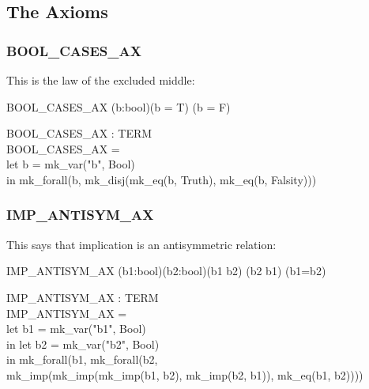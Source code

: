 \documentclass[a4paper,11pt,titlepage]{article}
\begin{document}
\begin{titlepage}
\subsection{The Axioms}
\subsubsection{BOOL\_CASES\_AX}
This is the law of the excluded middle:
\begin{GFT}{}
\+BOOL\_CASES\Backslash{}\_AX \MMM{\Zthm} \MMM{\forall}(b:bool)\MMM{\bullet}(b = T) \MMM{\lor} (b = F)\\
\end{GFT}
\begin{HOLConst}
\+	\PrNL{}BOOL\_CASES\_AX\PrNN{} : TERM\\
\PrPH{}
\+	BOOL\_CASES\_AX =\\
\+	let b = mk\_var("b", Bool)\\
\+	in mk\_forall(b, mk\_disj(mk\_eq(b, Truth), mk\_eq(b, Falsity)))\\
\end{HOLConst}

\subsubsection{IMP\_ANTISYM\_AX}

This says that implication is an antisymmetric
relation:
\begin{GFT}{}
\+IMP\_ANTISYM\_AX \MMM{\Zthm} \MMM{\forall}(b1:bool)\MMM{\bullet}\MMM{\forall}(b2:bool)\MMM{\bullet}(b1 \MMM{\Rightarrow} b2) \MMM{\Rightarrow} (b2 \MMM{\Rightarrow} b1) \MMM{\Rightarrow} (b1=b2)\\
\end{GFT}
\begin{HOLConst}
\+	\PrNL{}IMP\_ANTISYM\_AX\PrNN{} : TERM\\
\PrPH{}
\+	IMP\_ANTISYM\_AX =\\
\+	let b1 = mk\_var("b1", Bool)\\
\+	in let b2 = mk\_var("b2", Bool)\\
\+	in mk\_forall(b1, mk\_forall(b2,\\
\+		mk\_imp(mk\_imp(mk\_imp(b1, b2), mk\_imp(b2, b1)), mk\_eq(b1, b2))))\\
\end{HOLConst}


\end{titlepage}
\end{document}

